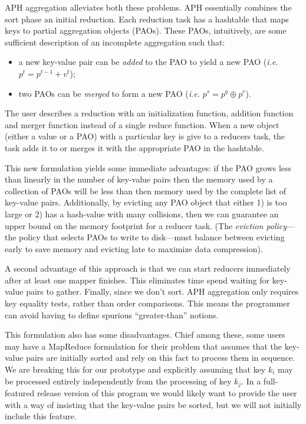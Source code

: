 \documentclass[10pt,letter,final,article,twocolumn]{article} %
\begin{document}
 APH aggregation alleviates both these problems. APH essentially combines the sort phase an initial reduction. Each reduction task has a hashtable that maps keys to partial aggregation objects (PAOs). These PAOs, intuitively, are some sufficient description of an incomplete aggregation such that:
\begin{itemize}
 \item a new key-value pair can be \emph{added} to the PAO to yield a new PAO (\emph{i.e.} $p^t = p^{t-1} + v^t$);
 \item two PAOs can be \emph{merged} to form a new PAO (\emph{i.e.} $p^s = p^q \oplus p^r$).
\end{itemize}
The user describes a reduction with an initialization function, addition function and merger function instead of a single reduce function. When a new object (either a value or a PAO) with a particular key is give to a reducers task, the task adds it to or merges it with the appropriate PAO in the hashtable.

This new formulation yields some immediate advantages: if the PAO grows less than linearly in the number of key-value pairs then the memory used by a collection of PAOs will be less than then memory used by the complete list of key-value pairs. Additionally, by evicting any PAO object that either 1) is too large or 2) has a hash-value with many collisions, then we can guarantee an upper bound on the memory footprint for a reducer task. (The \emph{eviction policy}---the policy that selects PAOs to write to disk---must balance between evicting early to save memory and evicting late to maximize data compression).  

A second advantage of this approach is that we can start reducers immediately after at least one mapper finishes. This eliminates time spend waiting for key-value pairs to gather. Finally, since we don't sort. APH aggregation only requires key equality tests, rather than order comparisons. This means the programmer can avoid having to define spurious ``greater-than'' notions.

This formulation also has some disadvantages. Chief among these, some users may have a MapReduce formulation for their problem that assumes that the key-value pairs are initially sorted and rely on this fact to process them in sequence. We are breaking this for our prototype and explicitly assuming that key $k_i$ may be processed entirely independently from the processing of key $k_j$. In a full-featured release version of this program we would likely want to provide the user with a way of insisting that the key-value pairs be sorted, but we will not initially include this feature.
\end{document}
